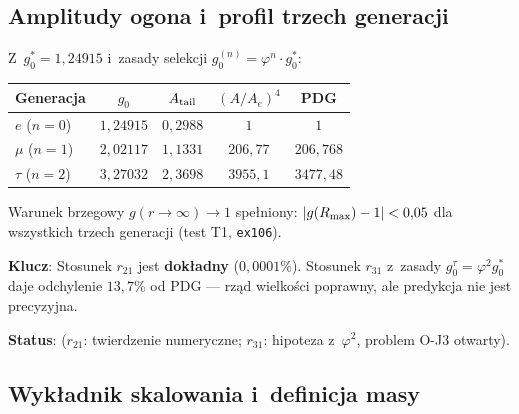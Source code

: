 \subsection{Amplitudy ogona i~profil trzech generacji}\label{app:J2-profile}

\begin{proposition}\label{prop:J2-profiles}
Z~$g_0^* = 1{,}24915$ i~zasady selekcji $g_0^{(n)} = \varphi^n \cdot g_0^*$:
\begin{center}\small
\begin{tabular}{@{}lcccc@{}}
\toprule
Generacja & $g_0$ & $A_{\rm tail}$ & $(A/A_e)^4$ & PDG \\
\midrule
$e$ ($n=0$) & $1{,}24915$ & $0{,}2988$ & $1$ & $1$ \\
$\mu$ ($n=1$) & $2{,}02117$ & $1{,}1331$ & $206{,}77$ & $206{,}768$ \\
$\tau$ ($n=2$) & $3{,}27032$ & $2{,}3698$ & $3955{,}1$ & $3477{,}48$ \\
\bottomrule
\end{tabular}
\end{center}
Warunek brzegowy $g(r \to \infty) \to 1$ spe\l{}niony:
$|g(R_{\rm max}) - 1| < 0{,}05$ dla wszystkich trzech generacji
(test T1, \texttt{ex106}).

\medskip\noindent
\textbf{Klucz}: Stosunek $r_{21}$ jest \textbf{dok\l{}adny} ($0{,}0001\%$).
Stosunek $r_{31}$ z~zasady $g_0^\tau = \varphi^2 g_0^*$ daje
odchylenie $13{,}7\%$ od PDG --- rz\k{a}d wielko\'sci poprawny,
ale predykcja nie jest precyzyjna.

\textbf{Status}:  ($r_{21}$: twierdzenie numeryczne;
$r_{31}$: hipoteza z~$\varphi^2$, problem O-J3 otwarty).
\end{proposition}

\subsection{Wykładnik skalowania i~definicja masy}\label{app:J2-skalowanie}


